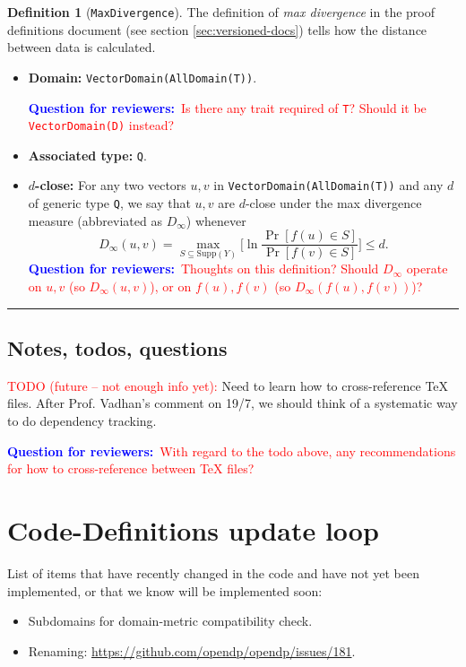 \documentclass[11pt,a4paper]{article}
\theoremstyle{definition}
\newtheorem{definition}[theorem]{Definition}
\newcommand{\horizline}{\noindent\rule{\textwidth}{1pt}}
\newcommand{\metricDefn}[1]{The definition of \emph{#1} in the proof definitions document (see section \ref{sec:versioned-docs}) tells how the distance between data is calculated.}
\newcommand{\questionr}[1]{\textcolor{blue}{\textbf{Question for reviewers:}}\textcolor{red}{~#1}}
\newcommand{\todonei}{{\textcolor{red}{TODO (future -- not enough info yet): }}}
\begin{document}
\begin{definition}[\texttt{MaxDivergence}]
    \metricDefn{max divergence} 
    \begin{itemize}
    \item \textbf{Domain:} \texttt{VectorDomain(AllDomain(T))}.
    
    \questionr{Is there any trait required of \texttt{T}? Should it be \texttt{VectorDomain(D)} instead?}
    \item \textbf{Associated type:} \texttt{Q}.
    \item \textbf{$d$-close:} For any two vectors $u, v$ in \texttt{VectorDomain(AllDomain(T))} and any $d$ of generic type \texttt{Q}, we say that $u, v$ are $d$-close under the max divergence measure (abbreviated as $D_{\infty}$) whenever
    \[
        D_{\infty}(u, v) = \max_{S \subseteq \textrm{Supp}(Y)} \Big[\ln \dfrac{\Pr[f(u) \in S]}{\Pr[f(v) \in S]} \Big] \leq d.
    \]
    \questionr{Thoughts on this definition? Should $D_{\infty}$ operate on $u,v$ (so $D_{\infty}(u,v)$), or on $f(u),f(v)$ (so $D_{\infty}(f(u),f(v))$)?}
\end{itemize}
\end{definition}

\horizline

\subsection{Notes, todos, questions}

\todonei{Need to learn how to cross-reference TeX files. After Prof. Vadhan's comment on 19/7, we should think of a systematic way to do dependency tracking.}

\questionr{With regard to the todo above, any recommendations for how to cross-reference between TeX files?}

\section{Code-Definitions update loop}
List of items that have recently changed in the code and have not yet been implemented, or that we know will be implemented soon:
\begin{itemize}
    \item Subdomains for domain-metric compatibility check.
    \item Renaming: \url{https://github.com/opendp/opendp/issues/181}.
\end{itemize}
\end{document}

